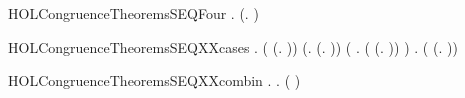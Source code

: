 \newcommand{\HOLCongruenceTheoremsSEQThreea}{\UseVerbatim{HOLCongruenceTheoremsSEQThreea}}
\begin{SaveVerbatim}{HOLCongruenceTheoremsSEQFour}
\HOLTokenTurnstile{} \HOLSymConst{\HOLTokenForall{}} .   \HOLSymConst{\HOLTokenConj{}}   \HOLSymConst{\HOLTokenImp{}}  (\HOLTokenLambda{}.   \HOLSymConst{\ensuremath{+}}  )
\end{SaveVerbatim}
\newcommand{\HOLCongruenceTheoremsSEQFour}{\UseVerbatim{HOLCongruenceTheoremsSEQFour}}
\begin{SaveVerbatim}{HOLCongruenceTheoremsSEQXXcases}
\HOLTokenTurnstile{} \HOLSymConst{\HOLTokenForall{}}.
         \HOLSymConst{\HOLTokenEquiv{}}
       ( \HOLSymConst{=} (\HOLTokenLambda{}. )) \HOLSymConst{\HOLTokenDisj{}} (\HOLSymConst{\HOLTokenExists{}}.  \HOLSymConst{=} (\HOLTokenLambda{}. )) \HOLSymConst{\HOLTokenDisj{}}
       (\HOLSymConst{\HOLTokenExists{}} . ( \HOLSymConst{=} (\HOLTokenLambda{}.  )) \HOLSymConst{\HOLTokenConj{}}  ) \HOLSymConst{\HOLTokenDisj{}}
       \HOLSymConst{\HOLTokenExists{}} . ( \HOLSymConst{=} (\HOLTokenLambda{}.   \HOLSymConst{\ensuremath{+}}  )) \HOLSymConst{\HOLTokenConj{}}   \HOLSymConst{\HOLTokenConj{}}  
\end{SaveVerbatim}
\newcommand{\HOLCongruenceTheoremsSEQXXcases}{\UseVerbatim{HOLCongruenceTheoremsSEQXXcases}}
\begin{SaveVerbatim}{HOLCongruenceTheoremsSEQXXcombin}
\HOLTokenTurnstile{} \HOLSymConst{\HOLTokenForall{}}.   \HOLSymConst{\HOLTokenImp{}} \HOLSymConst{\HOLTokenForall{}}.   \HOLSymConst{\HOLTokenImp{}}  ( \HOLConst{\HOLTokenCompose} )
\end{SaveVerbatim}
